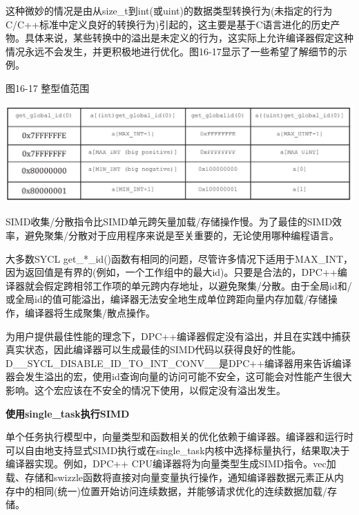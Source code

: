 这种微妙的情况是由从size\_t到int(或uint)的数据类型转换行为(未指定的行为C/C++标准中定义良好的转换行为)引起的，这主要是基于C语言进化的历史产物。具体来说，某些转换中的溢出是未定义的行为，这实际上允许编译器假定这种情况永远不会发生，并更积极地进行优化。图16-17显示了一些希望了解细节的示例。\par

\hspace*{\fill} \par %
图16-17 整型值范围
\begin{center}
	\includegraphics[width=1.0\textwidth]{content/chapter-16/images/12}
\end{center}

SIMD收集/分散指令比SIMD单元跨矢量加载/存储操作慢。为了最佳的SIMD效率，避免聚集/分散对于应用程序来说是至关重要的，无论使用哪种编程语言。\par

大多数SYCL get\_*\_id()函数有相同的问题，尽管许多情况下适用于MAX\_INT，因为返回值是有界的(例如，一个工作组中的最大id)。只要是合法的，DPC++编译器就会假定跨相邻工作项的单元跨内存地址，以避免聚集/分散。由于全局id和/或全局id的值可能溢出，编译器无法安全地生成单位跨距向量内存加载/存储操作，编译器将生成聚集/散点操作。\par

为用户提供最佳性能的理念下，DPC++编译器假定没有溢出，并且在实践中捕获真实状态，因此编译器可以生成最佳的SIMD代码以获得良好的性能。D\_\_SYCL\_DISABLE\_ID\_TO\_INT\_CONV\_\_是DPC++编译器用来告诉编译器会发生溢出的宏，使用id查询向量的访问可能不安全，这可能会对性能产生很大影响。这个宏应该在不安全的情况下使用，以假定没有溢出发生。\par

\hspace*{\fill} \par %
\textbf{使用single\_task执行SIMD}

单个任务执行模型中，向量类型和函数相关的优化依赖于编译器。编译器和运行时可以自由地支持显式SIMD执行或在single\_task内核中选择标量执行，结果取决于编译器实现。例如，DPC++ CPU编译器将为向量类型生成SIMD指令。vec加载、存储和swizzle函数将直接对向量变量执行操作，通知编译器数据元素正从内存中的相同(统一)位置开始访问连续数据，并能够请求优化的连续数据加载/存储。\par

